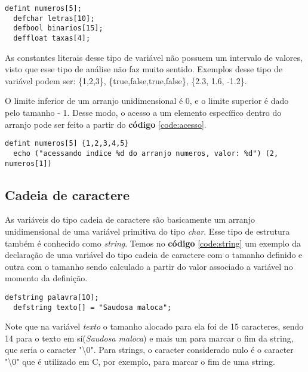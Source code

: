 \documentclass[
  12pt,				%
  oneside,			%
  a4paper,			%
  english,			%
  french,				%
  spanish,			%
  brazil,				%
]{abntex2}
\begin{document}
\begin{lstlisting}[label=code:arranjos-unidimensionais,caption=Declaração
    de uma variável do tipo arranjo unidimensional.]
  defint numeros[5];
  defchar letras[10];
  defbool binarios[15];
  deffloat taxas[4];
\end{lstlisting}

As constantes literais desse tipo de variável não possuem um intervalo
de valores, visto que esse tipo de análise não faz muito
sentido. Exemplos desse tipo de variável podem ser: \{1,2,3\},
\{true,false,true,false\}, \{2.3, 1.6, -1.2\}.

O limite inferior de um arranjo unidimensional é 0, e o limite
superior é dado pelo tamanho - 1. Desse modo, o acesso a um elemento
específico dentro do arranjo pode ser feito a partir do
\textbf{código} \ref{code:acesso}.

\begin{lstlisting}[label=code:acesso,caption=Acessando elemento dentro
    de um arranjo unidimensional]
  defint numeros[5] {1,2,3,4,5}
  echo ("acessando indice %d do arranjo numeros, valor: %d") (2, numeros[1]) 
\end{lstlisting}


\subsection{Cadeia de caractere}
\label{subsec:cadeia-de-caractere}

As variáveis do tipo cadeia de caractere são basicamente um arranjo
unidimensional de uma variável primitiva do tipo \emph{char}. Esse
tipo de estrutura também é conhecido como \emph{string}. Temos no
\textbf{código} \ref{code:string} um exemplo da declaração de uma
variável do tipo cadeia de caractere com o tamanho definido e outra
com o tamanho sendo calculado a partir do valor associado a variável
no momento da definição.

\begin{lstlisting}[label=code:string,caption=Declaração de variáveis
    do tipo cadeia de caractere.]
  defstring palavra[10];
  defstring texto[] = "Saudosa maloca";
\end{lstlisting}

Note que na variável \emph{texto} o tamanho alocado para ela foi de
15 caracteres, sendo 14 para o texto em sí(\emph{Saudosa maloca}) e
mais um para marcar o fim da string, que seria o caracter "\textbackslash0". Para
strings, o caracter considerado nulo é o caracter "\textbackslash0"
que é utilizado em C, por exemplo, para marcar o fim de uma string.
\end{document}
